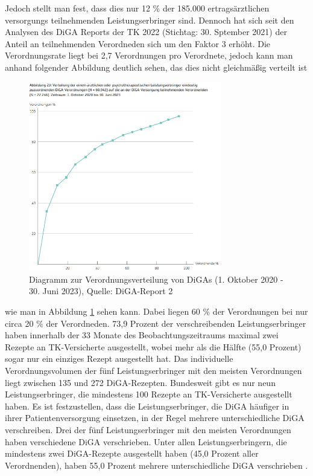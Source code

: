 \documentclass{article}
\begin{document}
			Jedoch stellt man fest, dass dies nur 12 \% der 185.000 ertragsärztlichen versorgungs teilnehmenden Leistungserbringer sind. Dennoch hat sich seit den Analysen des DiGA Reports der TK 2022 (Stichtag: 30. Sptember 2021) der Anteil an teilnehmenden Verordneden sich um den Faktor 3 erhöht. Die Verordnungsrate liegt bei 2,7 Verordnungen pro Verordnete, jedoch kann man anhand folgender Abbildung deutlich sehen, das dies nicht gleichmäßig verteilt ist
			\begin{figure}[hbtp]
				\centering
				\includegraphics[width=0.75\textwidth]{./grafiken/abbildung_verordnungen_pro_verordneten_diga}
				\caption[Verordnungsverteilung (1. Oktober 2020 - 30. Juni 2023)]{Diagramm zur Verordnungsverteilung von DiGAs (1. Oktober 2020 - 30. Juni 2023), Quelle: DiGA-Report 2 \cite{TK-Report-2}}
				\label{Abb-verordnungen-diga}
			\end{figure}
			wie man in Abbildung \ref{Abb-verordnungen-diga} sehen kann. Dabei liegen 60 \% der Verordnungen bei nur circa 20 \% der Verordneden. 73,9 Prozent der verschreibenden Leistungserbringer haben innerhalb der 33 Monate des Beobachtungszeitraums maximal zwei Rezepte an TK-Versicherte ausgestellt, wobei mehr als die Hälfte (55,0 Prozent) sogar nur ein einziges Rezept ausgestellt hat. Das individuelle Verordnungsvolumen der fünf Leistungserbringer mit den meisten Verordnungen liegt zwischen 135 und 272 DiGA-Rezepten. Bundesweit gibt es nur neun Leistungserbringer, die mindestens 100 Rezepte an TK-Versicherte ausgestellt haben. Es ist festzustellen, dass die Leistungserbringer, die DiGA häufiger in ihrer Patientenversorgung einsetzen, in der Regel mehrere unterschiedliche DiGA verschreiben. Drei der fünf Leistungserbringer mit den meisten Verordnungen haben verschiedene DiGA verschrieben. Unter allen Leistungserbringern, die mindestens zwei DiGA-Rezepte ausgestellt haben (45,0 Prozent aller Verordnenden), haben 55,0 Prozent mehrere unterschiedliche DiGA verschrieben \cite[vgl. S. 28]{TK-Report-2}.
			
\end{document}
